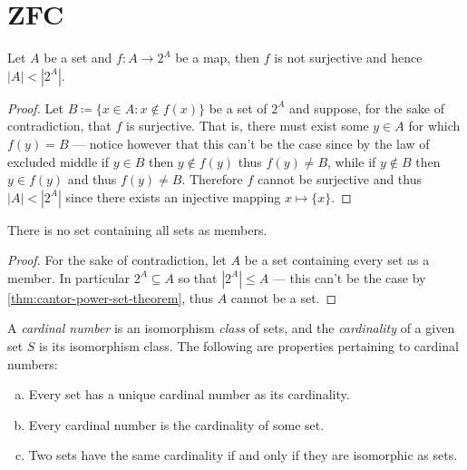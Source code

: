 \section{ZFC}

\begin{theorem}[Cantor]
\label{thm:cantor-power-set-theorem}
Let \(A\) be a set and \(f: A \to 2^A\) be a map, then \(f\) is not surjective
and hence \(|A| < |2^A|\).
\end{theorem}

\begin{proof}
Let \(B \coloneq \{x \in A \colon x \notin f(x)\}\) be a set of \(2^A\) and
suppose, for the sake of contradiction, that \(f\) is surjective. That is,
there must exist some \(y \in A\) for which \(f(y) = B\) --- notice however that
this can't be the case since by the law of excluded middle if \(y \in B\) then
\(y \notin f(y)\) thus \(f(y) \neq B\), while if \(y \notin B\) then \(y \in
f(y)\) and thus \(f(y) \neq B\). Therefore \(f\) cannot be surjective and thus
\(|A| < |2^A|\) since there exists an injective mapping \(x \mapsto \{x\}\).
\end{proof}

\begin{theorem}
\label{thm:no-set-contains-all-sets}
There is no set containing all sets as members.
\end{theorem}

\begin{proof}
For the sake of contradiction, let \(A\) be a set containing every set as a
member. In particular \(2^A \subseteq A\) so that \(|2^A| \leq A\) --- this
can't be the case by \cref{thm:cantor-power-set-theorem}, thus \(A\) cannot be a
set.
\end{proof}

\begin{definition}
\label{def:ordinal-cardinal}
A \emph{cardinal number} is an isomorphism \emph{class} of sets, and the
\emph{cardinality} of a given set \(S\) is its isomorphism class. The following
are properties pertaining to cardinal numbers:
\begin{enumerate}[(a)]\setlength\itemsep{0em}
\item Every set has a unique cardinal number as its cardinality.
\item Every cardinal number is the cardinality of some set.
\item Two sets have the same cardinality if and only if they are isomorphic as
  sets.
\end{enumerate}
\end{definition}

